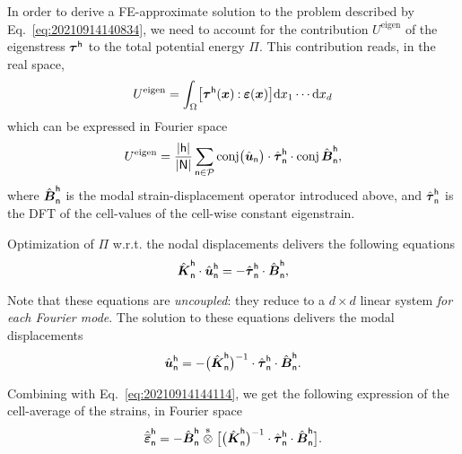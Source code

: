 In order to derive a FE-approximate solution to the problem described by
Eq.~\eqref{eq:20210914140834}, we need to account for the contribution
\(U^\text{eigen}\) of the eigenstress \(\boldsymbol\tau^\mathsf{h}\) to the total
potential energy \(\Pi\). This contribution reads, in the real space,
\begin{equation}
  U^\text{eigen}=\int_\Omega\bigl[\boldsymbol\tau^\mathsf{h}(\boldsymbol x)
  \mathbin{\mathord{:}}\boldsymbol\varepsilon(\boldsymbol x)\bigr]\mathrm d x_1\cdots\mathrm d x_d
\end{equation}
which can be expressed in Fourier space
\begin{equation}
  U^\text{eigen}=\frac{\lvert\mathsf{h}\rvert}{\lvert\mathsf{N}\rvert}
  \sum_{\mathsf{n}\in\mathcal{P}}\operatorname{conj}\bigl(\hat{\boldsymbol u}_\mathsf{n}\bigr)
  \cdot\hat{\boldsymbol\tau}_\mathsf{n}^\mathsf{h}\cdot
  \operatorname{conj}\hat{\boldsymbol B}_\mathsf{n}^\mathsf{h},
\end{equation}
where \(\hat{\boldsymbol B}_\mathsf{n}^\mathsf{h}\) is the modal strain-displacement
operator introduced above, and \(\hat{\boldsymbol\tau}_\mathsf{n}^\mathsf{h}\) is the
DFT of the cell-values of the cell-wise constant eigenstrain.

Optimization of \(\Pi\) w.r.t. the nodal displacements delivers the following
equations
\begin{equation}
  \label{eq:20210914145137}
  \hat{\boldsymbol K}_\mathsf{n}^\mathsf{h}\cdot\hat{\boldsymbol u}_\mathsf{n}^\mathsf{h}
  =-\hat{\boldsymbol\tau}_\mathsf{n}^\mathsf{h}\cdot\hat{\boldsymbol B}_\mathsf{n}^\mathsf{h},
\end{equation}

Note that these equations are \emph{uncoupled}: they reduce to a \(d\times d\)
linear system \emph{for each Fourier mode}. The solution to these equations
delivers the modal displacements
\begin{equation}
  \hat{\boldsymbol u}_\mathsf{n}^\mathsf{h}
  =-\bigl(\hat{\boldsymbol K}_\mathsf{n}^\mathsf{h}\bigr)^{-1}
  \cdot\hat{\boldsymbol\tau}_\mathsf{n}^\mathsf{h}
  \cdot\hat{\boldsymbol B}_\mathsf{n}^\mathsf{h}.
\end{equation}

Combining with Eq.~\eqref{eq:20210914144114}, we get the following expression of
the cell-average of the strains, in Fourier space
\begin{equation}
  \hat{\overline{\boldsymbol\varepsilon}}_\mathsf{n}^\mathsf{h}
  =-\hat{\boldsymbol B}_\mathsf{n}^\mathsf{h}\stackrel{\mathrm{s}}{\otimes}
  \bigl[\bigl(\hat{\boldsymbol K}_\mathsf{n}^\mathsf{h}\bigr)^{-1}
  \cdot\hat{\boldsymbol\tau}_\mathsf{n}^\mathsf{h}\cdot\hat{\boldsymbol B}_\mathsf{n}^\mathsf{h}\bigr].
\end{equation}

